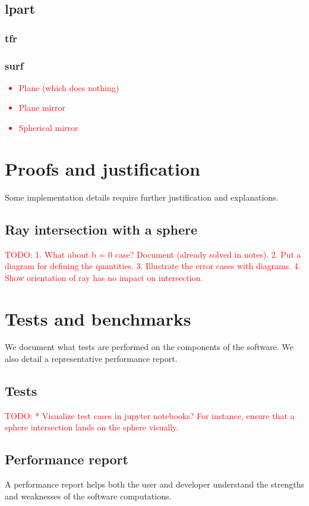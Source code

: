 \subsection{lpart}

\subsubsection{tfr}

\subsubsection{surf}
\textcolor{red}{
\begin{itemize}
\item Plane (which does nothing)
\item Plane mirror
\item Spherical mirror
\end{itemize}}

\section{Proofs and justification}
Some implementation details require further justification and explanations.

\subsection{Ray intersection with a sphere}
\textcolor{red}{TODO:
1. What about b = 0 case? Document (already solved in notes).
2. Put a diagram for defining the quantities.
3. Illustrate the error cases with diagrams.
4. Show orientation of ray has no impact on intersection.}

\section{Tests and benchmarks}
We document what tests are performed on the components of the software.
We also detail a representative performance report.

\subsection{Tests}
\textcolor{red}{TODO:
* Visualize test cases in jupyter notebooks? For instance, ensure that
  a sphere intersection lands on the sphere visually.}

\subsection{Performance report}
A performance report helps both the user and developer understand the strengths
and weaknesses of the software computations.

